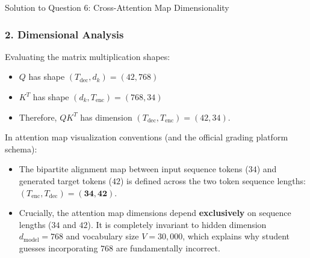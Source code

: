\documentclass[11pt,a4paper]{article}
\begin{document}
\begin{solutionbox}{Solution to Question 6: Cross-Attention Map Dimensionality}
\subsubsection*{2. Dimensional Analysis}
Evaluating the matrix multiplication shapes:
\begin{itemize}[itemsep=2pt]
    \item $Q$ has shape $(T_{\text{dec}}, d_k) = (42, 768)$
    \item $K^T$ has shape $(d_k, T_{\text{enc}}) = (768, 34)$
    \item Therefore, $Q K^T$ has dimension $(T_{\text{dec}}, T_{\text{enc}}) = (42, 34)$.
\end{itemize}
In attention map visualization conventions (and the official grading platform schema):
\begin{itemize}[itemsep=2pt]
    \item The bipartite alignment map between input sequence tokens ($34$) and generated target tokens ($42$) is defined across the two token sequence lengths: $(T_{\text{enc}}, T_{\text{dec}}) = \mathbf{(34, 42)}$.
    \item Crucially, the attention map dimensions depend \textbf{exclusively} on sequence lengths ($34$ and $42$). It is completely invariant to hidden dimension $d_{\text{model}} = 768$ and vocabulary size $V = 30{,}000$, which explains why student guesses incorporating $768$ are fundamentally incorrect.
\end{itemize}
\end{solutionbox}

\vspace{10pt}
\end{document}
